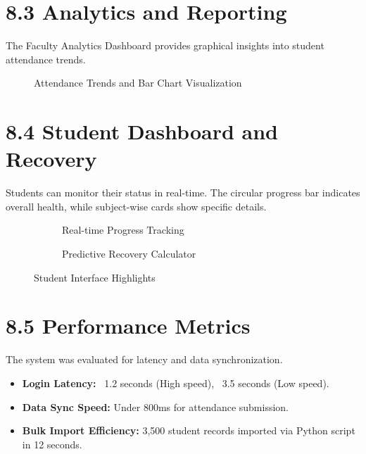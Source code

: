 \documentclass[12pt,a4paper]{report}
\begin{document}
\section*{8.3 Analytics and Reporting}
The Faculty Analytics Dashboard provides graphical insights into student attendance trends.

\begin{figure}[H]
    \centering
    \caption{Attendance Trends and Bar Chart Visualization}
\end{figure}

\section*{8.4 Student Dashboard and Recovery}
Students can monitor their status in real-time. The circular progress bar indicates overall health, while subject-wise cards show specific details.

\begin{figure}[H]
    \centering
    \begin{subfigure}[b]{0.45\textwidth}
        \centering
        \caption{Real-time Progress Tracking}
    \end{subfigure}
    \hfill
    \begin{subfigure}[b]{0.45\textwidth}
        \centering
        \caption{Predictive Recovery Calculator}
    \end{subfigure}
    \caption{Student Interface Highlights}
\end{figure}

\section*{8.5 Performance Metrics}
The system was evaluated for latency and data synchronization.
\begin{itemize}
    \item \textbf{Login Latency:} ~1.2 seconds (High speed), ~3.5 seconds (Low speed).
    \item \textbf{Data Sync Speed:} Under 800ms for attendance submission.
    \item \textbf{Bulk Import Efficiency:} 3,500 student records imported via Python script in 12 seconds.
\end{itemize}
\end{document}
